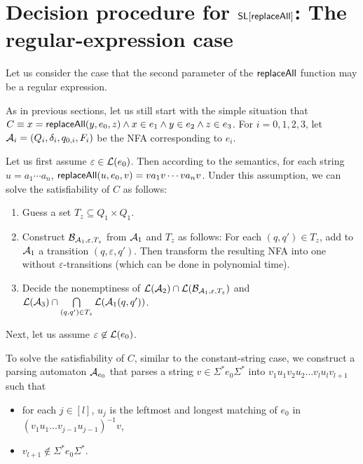 
\section{Decision procedure for $\mathsf{SL}[\mathsf{replaceAll}]$: The regular-expression case} \label{sec:replaceallre}

Let us consider the case that the second parameter of the $\mathsf{replaceAll}$ function may be a regular expression. 

As in previous sections, let us still start with the simple situation that $C \equiv x = \mathsf{replaceAll}(y, e_0, z) \wedge x \in e_1 \wedge y \in e_2 \wedge z \in e_3$. For $i=0,1,2,3$, let $\mathcal{A}_i = (Q_i, \delta_i, q_{0,i}, F_i)$ be the NFA corresponding to $e_i$. 

Let us first assume $\varepsilon \in \mathcal{L}(e_0)$. Then according to the semantics, for each string $u = a_1 \cdots a_n$, $\mathsf{replaceAll}(u, e_0, v) = v a_1 v \cdots v a_n v$. Under this assumption, we can solve the satisfiability of $C$ as follows: 
\begin{enumerate}
\item Guess a set $T_z \subseteq Q_1 \times Q_1$. 
%
\item Construct $\mathcal{B}_{\mathcal{A}_1, \varepsilon, T_z}$ from $\mathcal{A}_1$ and $T_z$ as follows: For each $(q,q') \in T_z$, add to $\mathcal{A}_1$ a transition $(q, \varepsilon, q')$. Then transform the resulting NFA into one without $\varepsilon$-transitions (which can be done in polynomial time).
%
\item  Decide the nonemptiness of $\mathcal{L}(\mathcal{A}_2) \cap \mathcal{L}(\mathcal{B}_{\mathcal{A}_1, \varepsilon, T_z})$ and $\mathcal{L}(\mathcal{A}_3) \cap \bigcap \limits_{(q,q') \in T_z} \mathcal{L}(\mathcal{A}_1(q,q'))$.
\end{enumerate}

Next, let us assume $\varepsilon \not \in \mathcal{L}(e_0)$.

To solve the satisfiability of $C$, similar to the constant-string case, we construct a parsing automaton $\mathcal{A}_{e_0}$ that parses a string $v \in \Sigma^\ast e_0 \Sigma^\ast$ into $v_1 u_1 v_2 u_2 \dots v_l u_l v_{l+1}$ such that 
\begin{itemize}
	\item for each $j \in [l]$, $u_j$ is the leftmost and longest matching of $e_0$ in $(v_1 u_1 \dots v_{j-1} u_{j-1})^{-1} v$,
	\item $v_{l+1} \not \in \Sigma^\ast e_0 \Sigma^\ast$.
\end{itemize}


